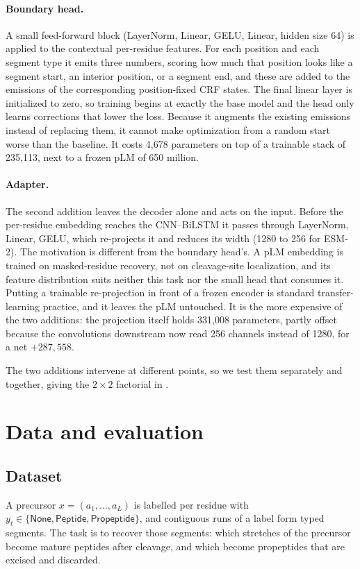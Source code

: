 \documentclass{article}
\begin{document}
\paragraph{Boundary head.} A small feed-forward block (LayerNorm, Linear, GELU, Linear, hidden size 64) is applied to the contextual per-residue features. For each position and each segment type it emits three numbers, scoring how much that position looks like a segment start, an interior position, or a segment end, and these are added to the emissions of the corresponding position-fixed CRF states. The final linear layer is initialized to zero, so training begins at exactly the base model and the head only learns corrections that lower the loss. Because it augments the existing emissions instead of replacing them, it cannot make optimization from a random start worse than the baseline. It costs 4{,}678 parameters on top of a trainable stack of 235{,}113, next to a frozen pLM of 650 million.

\paragraph{Adapter.} The second addition leaves the decoder alone and acts on the input. Before the per-residue embedding reaches the CNN--BiLSTM it passes through LayerNorm, Linear, GELU, which re-projects it and reduces its width (1280 to 256 for ESM-2). The motivation is different from the boundary head's. A pLM embedding is trained on masked-residue recovery, not on cleavage-site localization, and its feature distribution suits neither this task nor the small head that consumes it. Putting a trainable re-projection in front of a frozen encoder is standard transfer-learning practice, and it leaves the pLM untouched. It is the more expensive of the two additions: the projection itself holds 331{,}008 parameters, partly offset because the convolutions downstream now read 256 channels instead of 1280, for a net $+287{,}558$.

The two additions intervene at different points, so we test them separately and together, giving the $2\times2$ factorial in .

\section{Data and evaluation}
\label{sec:eval}

\subsection{Dataset}
\label{sec:dataset}
A precursor $x=(a_1,\dots,a_L)$ is labelled per residue with $y_t \in \{\textsf{None},\textsf{Peptide},\textsf{Propeptide}\}$, and contiguous runs of a label form typed segments. The task is to recover those segments: which stretches of the precursor become mature peptides after cleavage, and which become propeptides that are excised and discarded.
\end{document}
